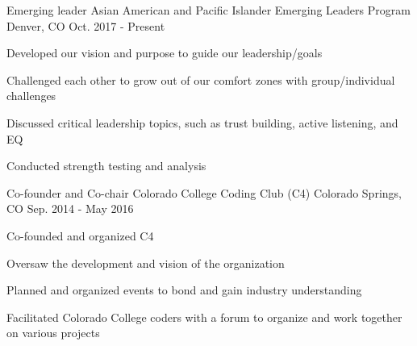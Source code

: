 


\begin{cventries}


\vspace{-.25em}
\cventry
{Emerging leader} %
{Asian American and Pacific Islander Emerging Leaders Program} %
{Denver, CO} %
{Oct. 2017 - Present} %
{ %
\begin{cvitems}
\item {Developed our vision and purpose to guide our leadership/goals}
\item {Challenged each other to grow out of our comfort zones with group/individual challenges}
\item {Discussed critical leadership topics, such as trust building, active listening, and EQ}
\item {Conducted strength testing and analysis}
\end{cvitems}
}


\vspace{-1.5em}
\cventry
{Co-founder and Co-chair} %
{Colorado College Coding Club (C4)} %
{Colorado Springs, CO} %
{Sep. 2014 - May 2016} %
{ %
\begin{cvitems}
\item {Co-founded and organized C4}
\item {Oversaw the development and vision of the organization}
\item {Planned and organized events to bond and gain industry understanding}
\item {Facilitated Colorado College coders with a forum to organize and work together on various projects}
\end{cvitems}
}


\end{cventries}
